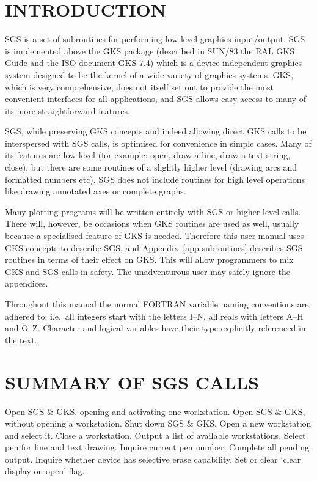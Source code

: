 \documentclass[11pt]{article}
\newcommand{\hyperref}[4]{#2\ref{#4}#3}
\newcommand{\xref}[3]{#1}
\begin{document}
\section{INTRODUCTION}

SGS is a set of subroutines for performing low-level graphics input/output.
SGS is implemented above the GKS package (described in \xref{SUN/83}{sun83}, 
the RAL GKS Guide
and the ISO document GKS 7.4) which is a device independent graphics system
designed to be the kernel of a wide variety of graphics systems.
GKS, which is very comprehensive, does not itself set out to provide the most
convenient interfaces for all applications, and SGS allows easy access to many
of its more straightforward features. 

SGS, while preserving GKS concepts and indeed allowing direct GKS calls to be
interspersed with SGS calls, is optimised for convenience in simple cases.
Many of its features are low level (for example: open, draw a line, draw a text
string, close), but there are some routines of a slightly higher level (drawing
arcs and formatted numbers etc). 
SGS does not include routines for high level operations like drawing annotated
axes or complete graphs.

Many plotting programs will be written entirely with SGS or higher level calls.
There will, however, be occasions when GKS routines are used as well, usually
because a specialised feature of GKS is needed. Therefore this user manual uses
GKS concepts to describe SGS, and 
\hyperref{this appendix}{Appendix~}{}{app-subroutines} describes SGS
routines in terms of their effect on GKS. This will allow programmers to mix
GKS and SGS calls in safety. The unadventurous user may safely ignore the
appendices.
 
Throughout this manual the normal FORTRAN variable naming conventions are
adhered to:  i.e.\ all integers start with the letters I--N, all reals with
letters A--H and O--Z. Character and logical variables have their type
explicitly referenced in the text.


\section{SUMMARY OF SGS CALLS}\label{sec-summary}

\begin{routinelist}
   Open SGS \& GKS, opening and activating one workstation.
   Open SGS \& GKS, without opening a workstation.
   Shut down SGS \& GKS.
   Open a new workstation and select it.
   Close a workstation.
   Output a list of available workstations.
   Select pen for line and text drawing.
   Inquire current pen number.
   Complete all pending output.
   Inquire whether device has selective erase capability.
   Set or clear `clear display on open' flag.
\end{routinelist}
\end{document}

